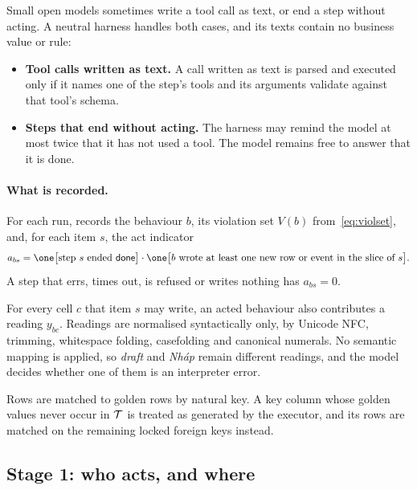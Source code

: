 Small open models sometimes write a tool call as text, or end a step without acting. A neutral harness handles both cases, and its texts contain no business value or rule:
\begin{itemize}[leftmargin=*]
\item \textbf{Tool calls written as text.} A call written as text is parsed and executed only if it names one of the step's tools and its arguments validate against that tool's schema.
\item \textbf{Steps that end without acting.} The harness may remind the model at most twice that it has not used a tool. The model remains free to answer that it is done.
\end{itemize}

\paragraph{What is recorded.} For each run, \specdx records the behaviour $b$, its violation set $V(b)$ from~\eqref{eq:violset}, and, for each item $s$, the act indicator
\begin{equation}
\label{eq:act}
a_{bs}=\one\bigl[\text{step } s \text{ ended } \textsf{done}\bigr]\cdot\one\bigl[\text{$b$ wrote at least one new row or event in the slice of } s\bigr].
\end{equation}
A step that errs, times out, is refused or writes nothing has $a_{bs}=0$.

For every cell $c$ that item $s$ may write, an acted behaviour also contributes a reading $y_{bc}$. Readings are normalised syntactically only, by Unicode NFC, trimming, whitespace folding, casefolding and canonical numerals. No semantic mapping is applied, so \textit{draft} and \textit{Nháp} remain different readings, and the model decides whether one of them is an interpreter error.

Rows are matched to golden rows by natural key. A key column whose golden values never occur in $\mathcal{T}$ is treated as generated by the executor, and its rows are matched on the remaining locked foreign keys instead.

\subsection{Stage 1: who acts, and where}
\label{sec:approach-act}

